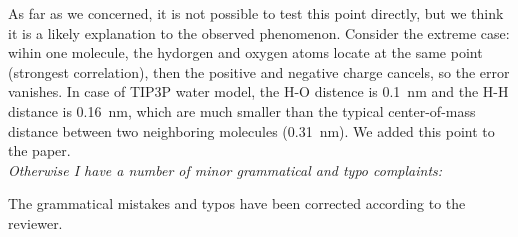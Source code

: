 \documentclass[a4paper]{article}
\begin{document}
As far as we concerned, it is not possible to test this point
directly, but we think it is a likely explanation to the observed
phenomenon.  Consider the extreme case: wihin one molecule, the
hydorgen and oxygen atoms locate at the same point (strongest
correlation), then the positive and negative charge cancels, so the
error vanishes. In case of TIP3P water model, the H-O distence is 0.1~nm and
the H-H distance is 0.16~nm, which are much smaller than the typical
center-of-mass distance between two neighboring molecules (0.31~nm).
We added this point to the paper.
\\

\textit{
Otherwise I have a number of minor grammatical and typo complaints:
}

The grammatical mistakes and typos have been corrected according to the reviewer.

            

               
\end{document}
